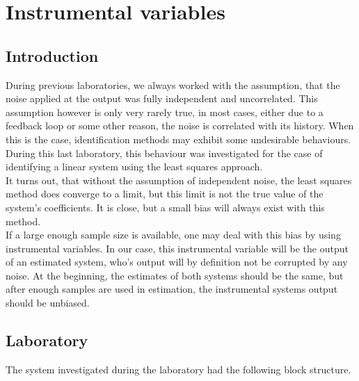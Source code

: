 \chapter{Instrumental variables}
\section{Introduction}
During previous laboratories, we always worked with the assumption, that 
the noise applied at the output was fully independent and uncorrelated. 
This assumption however is only very rarely true, in most cases, either due
to a feedback loop or some other reason, the noise is correlated with its
history. When this is the case, identification methods may exhibit some undesirable behaviours. During this last laboratory, this behaviour was investigated for the case of identifying a linear system using the least squares approach. \\
It turns out, that without the assumption of independent noise, the least squares method does converge to a limit, but this limit is not the true value of the system's coefficients. It is close, but a small bias will always exist with this method. \\
If a large enough sample size is available, one may deal with this bias by using instrumental variables. In our case, this instrumental variable will
be the output of an estimated system, who's output will by definition not be corrupted by any noise. At the beginning, the estimates of both systems
should be the same, but after enough samples are used in estimation, the instrumental systems output should be unbiased.

\section{Laboratory}

The system investigated during the laboratory had the following block structure.

